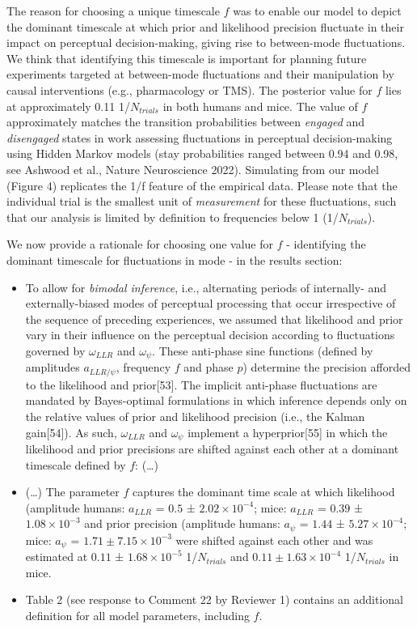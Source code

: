 \documentclass[
]{article}
\begin{document}
The reason for choosing a unique timescale \(f\) was to enable our model
to depict the dominant timescale at which prior and likelihood precision
fluctuate in their impact on perceptual decision-making, giving rise to
between-mode fluctuations. We think that identifying this timescale is
important for planning future experiments targeted at between-mode
fluctuations and their manipulation by causal interventions (e.g.,
pharmacology or TMS). The posterior value for \(f\) lies at
approximately 0.11 1/\(N_{trials}\) in both humans and mice. The value
of \(f\) approximately matches the transition probabilities between
\emph{engaged} and \emph{disengaged} states in work assessing
fluctuations in perceptual decision-making using Hidden Markov models
(stay probabilities ranged between 0.94 and 0.98, see Ashwood et al.,
Nature Neuroscience 2022). Simulating from our model (Figure 4)
replicates the 1/f feature of the empirical data. Please note that the
individual trial is the smallest unit of \emph{measurement} for these
fluctuations, such that our analysis is limited by definition to
frequencies below 1 (1/\(N_{trials}\)).

We now provide a rationale for choosing one value for \(f\) -
identifying the dominant timescale for fluctuations in mode - in the
results section:

\begin{itemize}
\item
  To allow for \emph{bimodal inference}, i.e., alternating periods of
  internally- and externally-biased modes of perceptual processing that
  occur irrespective of the sequence of preceding experiences, we
  assumed that likelihood and prior vary in their influence on the
  perceptual decision according to fluctuations governed by
  \(\omega_{LLR}\) and \(\omega_{\psi}\). These anti-phase sine
  functions (defined by amplitudes \(a_{LLR/\psi}\), frequency \(f\) and
  phase \(p\)) determine the precision afforded to the likelihood and
  prior{[}53{]}. The implicit anti-phase fluctuations are mandated by
  Bayes-optimal formulations in which inference depends only on the
  relative values of prior and likelihood precision (i.e., the Kalman
  gain{[}54{]}). As such, \(\omega_{LLR}\) and \(\omega_{\psi}\)
  implement a hyperprior{[}55{]} in which the likelihood and prior
  precisions are shifted against each other at a dominant timescale
  defined by \(f\): (\ldots)
\item
  (\ldots) The parameter \(f\) captures the dominant time scale at which
  likelihood (amplitude humans: \(a_{LLR}\) = \(0.5\) ±
  \(\ensuremath{2.02\times 10^{-4}}\); mice: \(a_{LLR}\) = \(0.39\) ±
  \(\ensuremath{1.08\times 10^{-3}}\) and prior precision (amplitude
  humans: \(a_{\psi}\) = \(1.44\) ± \(\ensuremath{5.27\times 10^{-4}}\);
  mice: \(a_{\psi}\) = \(1.71 ± \ensuremath{7.15\times 10^{-3}}\) were
  shifted against each other and was estimated at \(0.11\) ±
  \(\ensuremath{1.68\times 10^{-5}}\) 1/\(N_{trials}\) and
  \(0.11 ± \ensuremath{1.63\times 10^{-4}}\) 1/\(N_{trials}\) in mice.
\item
  Table 2 (see response to Comment 22 by Reviewer 1) contains an
  additional definition for all model parameters, including \(f\).
\end{itemize}
\end{document}
